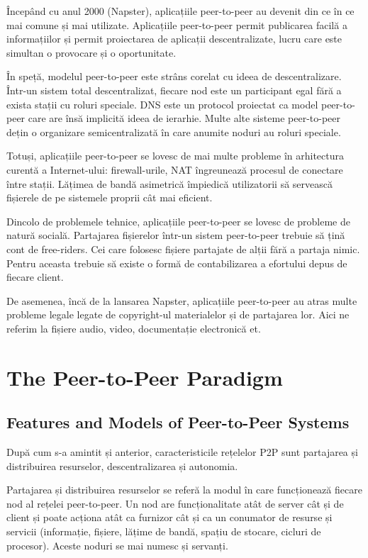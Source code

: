 Începând cu anul 2000 (Napster), aplicațiile peer-to-peer au devenit din ce în
ce mai comune și mai utilizate. Aplicațiile peer-to-peer permit publicarea
facilă a informațiilor și permit proiectarea de aplicații descentralizate,
lucru care este simultan o provocare și o oportunitate.

În speță, modelul peer-to-peer este strâns corelat cu ideea de
descentralizare. Într-un sistem total descentralizat, fiecare nod este un
participant egal fără a exista stații cu roluri speciale. DNS este un protocol
proiectat ca model peer-to-peer care are însă implicită ideea de ierarhie.
Multe alte sisteme peer-to-peer dețin o organizare semicentralizată în care
anumite noduri au roluri speciale.

Totuși, aplicațiile peer-to-peer se lovesc de mai multe probleme în
arhitectura curentă a Internet-ului: firewall-urile, NAT îngreunează procesul
de conectare între stații. Lățimea de bandă asimetrică împiedică utilizatorii
să servească fișierele de pe sistemele proprii cât mai eficient.

Dincolo de problemele tehnice, aplicațiile peer-to-peer se lovesc de probleme
de natură socială. Partajarea fișierelor într-un sistem peer-to-peer trebuie
să țină cont de free-riders. Cei care folosesc fișiere partajate de alții fără
a partaja nimic. Pentru aceasta trebuie să existe o formă de contabilizarea a
efortului depus de fiecare client.

De asemenea, încă de la lansarea Napster, aplicațiile peer-to-peer au atras
multe probleme legale legate de copyright-ul materialelor și de partajarea
lor. Aici ne referim la fișiere audio, video, documentație electronică et.

\section{The Peer-to-Peer Paradigm}
\label{sec:p2p-systems:paragigm}

\subsection{Features and Models of Peer-to-Peer Systems}

După cum s-a amintit și anterior, caracteristicile rețelelor P2P sunt
partajarea și distribuirea resurselor, descentralizarea și autonomia.

Partajarea și distribuirea resurselor se referă la modul în care funcționează
fiecare nod al rețelei peer-to-peer. Un nod are funcționalitate atât de server
cât și de client și poate acționa atât ca furnizor cât și ca un conumator de
resurse și servicii (informație, fișiere, lățime de bandă, spațiu de stocare,
cicluri de procesor). Aceste noduri se mai numesc și servanți.

